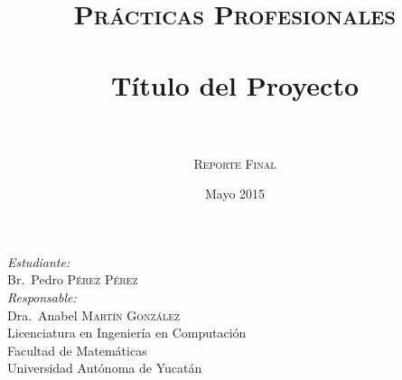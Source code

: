 \documentclass[letterpaper, 11pt]{article}
\title{
		\normalfont \large \textsc{Pr\'acticas Profesionales} \\ [0.3cm]
		\HRule \\[0.3cm]
		\Large \bfseries T\'itulo del Proyecto \\
		\HRule \\[0.3cm]
}
\author{\large \textsc{Reporte Final}} %
\date{\large {Mayo 2015}} %
\begin{document}
\maketitle %

%

\begin{center}
%
\emph{Estudiante:}\\
Br.~Pedro \textsc{Pérez Pérez}\\[0.3cm]
\emph{Responsable:}\\
Dra.~Anabel \textsc{Martín González}\\[0.3cm]

{\footnotesize 
Licenciatura en Ingeniería en Computación\\
Facultad de Matemáticas\\
Universidad Autónoma de Yucatán\\
}



%
%
\end{center}

\vspace{0.5cm}

\end{document}
